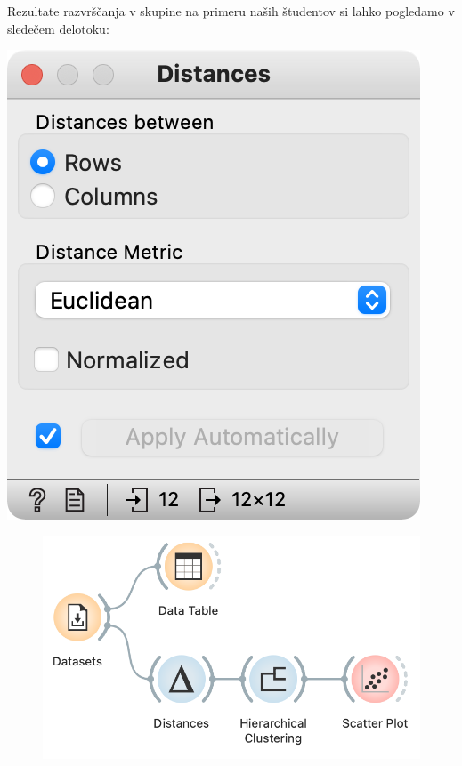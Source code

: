 \newpage

Rezultate razvrščanja v skupine na primeru naših študentov si lahko pogledamo v sledečem delotoku:

\begin{marginfigure}[2cm]
    \includegraphics[width=\linewidth]{distances.png}
    \caption{}
\end{marginfigure}

\begin{figure}[h]
    \includegraphics[width=\linewidth]{hierarchical-clustering-workflow.png}%
    \caption{ }
    \label{fig:010-hc-workflow}
\end{figure}

